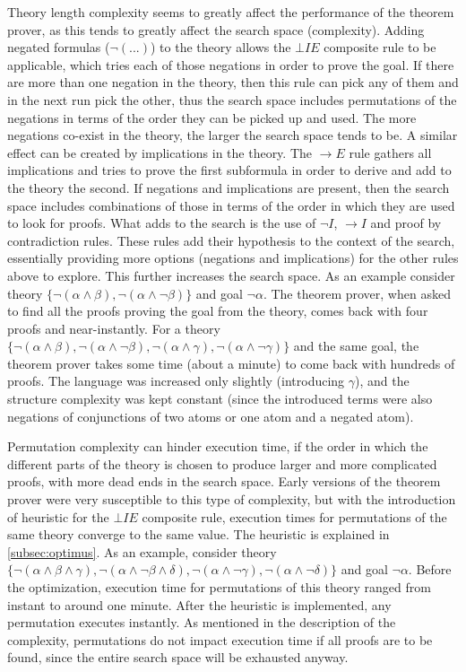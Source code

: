 \documentclass[11pt,twoside,a4paper]{report}
\begin{document}
Theory length complexity seems to greatly affect the performance of the theorem prover, as this tends to greatly affect the search space (complexity). Adding negated formulas ($\neg(...)$) to the theory allows the $\bot IE$ composite rule to be applicable, which tries each of those negations in order to prove the goal. If there are more than one negation in the theory, then this rule can pick any of them and in the next run pick the other, thus the search space includes permutations of the negations in terms of the order they can be picked up and used. The more negations co-exist in the theory, the larger the search space tends to be. A similar effect can be created by implications in the theory. The $\rightarrow E$ rule gathers all implications and tries to prove the first subformula in order to derive and add to the theory the second. If negations and implications are present, then the search space includes combinations of those in terms of the order in which they are used to look for proofs. What adds to the search is the use of $\neg I$, $\rightarrow I$ and proof by contradiction rules. These rules add their hypothesis to the context of the search, essentially providing more options (negations and implications) for the other rules above to explore. This further increases the search space. As an example consider theory $\{\neg(\alpha\wedge\beta), \neg(\alpha\wedge\neg\beta)\}$ and goal $\neg\alpha$. The theorem prover, when asked to find all the proofs proving the goal from the theory, comes back with four proofs and near-instantly. For a theory $\{\neg(\alpha\wedge\beta), \neg(\alpha\wedge\neg\beta), \neg(\alpha\wedge\gamma), \neg(\alpha\wedge\neg\gamma)\}$ and the same goal, the theorem prover takes some time (about a minute) to come back with hundreds of proofs. The language was increased only slightly (introducing $\gamma$), and the structure complexity was kept constant (since the introduced terms were also negations of conjunctions of two atoms or one atom and a negated atom).

Permutation complexity can hinder execution time, if the order in which the different parts of the theory is chosen to produce larger and more complicated proofs, with more dead ends in the search space. Early versions of the theorem prover were very susceptible to this type of complexity, but with the introduction of heuristic for the $\bot IE$ composite rule, execution times for permutations of the same theory converge to the same value. The heuristic is explained in \autoref{subsec:optimus}. As an example, consider theory $\{\neg(\alpha\wedge\beta\wedge\gamma), \neg(\alpha\wedge\neg\beta\wedge\delta), \neg(\alpha\wedge\neg\gamma), \neg(\alpha\wedge\neg\delta)\}$ and goal $\neg\alpha$. Before the optimization, execution time for permutations of this theory ranged from instant to around one minute. After the heuristic is implemented, any permutation executes instantly. As mentioned in the description of the complexity, permutations do not impact execution time if all proofs are to be found, since the entire search space will be exhausted anyway.
\end{document}
